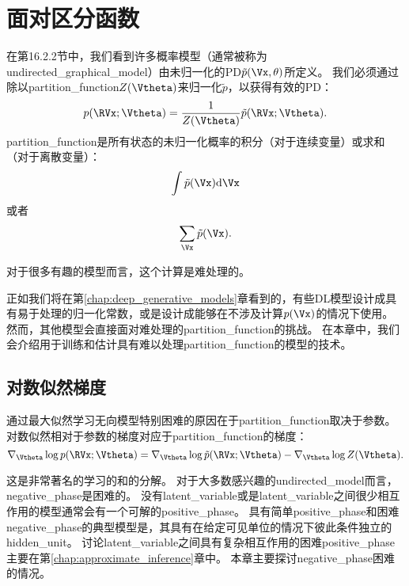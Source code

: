 \chapter{面对区分函数}
\label{chap:confronting_the_partition_function}
在第16.2.2节中，我们看到许多概率模型（通常被称为\gls{undirected_graphical_model}）由未归一化的\gls{PD}$\tilde{p}(\Vx, \theta)$所定义。
我们必须通过除以\gls{partition_function}$Z(\Vtheta)$来归一化$\tilde{p}$，以获得有效的\gls{PD}：
\begin{equation}
	p(\RVx; \Vtheta) = \frac{1}{Z(\Vtheta)} \tilde{p}(\RVx; \Vtheta).
\end{equation}
\gls{partition_function}是所有状态的未归一化概率的积分（对于连续变量）或求和（对于离散变量）：
\begin{equation}
	\int \tilde{p}(\Vx) \mathrm{d} \Vx
\end{equation}
或者
\begin{equation}
	\sum_{\Vx} \tilde{p} (\Vx).
\end{equation}


对于很多有趣的模型而言，这个计算是难处理的。


正如我们将在第\ref{chap:deep_generative_models}章看到的，有些\gls{DL}模型设计成具有易于处理的归一化常数，或是设计成能够在不涉及计算$p(\Vx)$的情况下使用。
然而，其他模型会直接面对难处理的\gls{partition_function}的挑战。
在本章中，我们会介绍用于训练和估计具有难以处理\gls{partition_function}的模型的技术。


\section{对数似然梯度}
\label{sec:the_log_likelihood_gradient}
通过最大似然学习无向模型特别困难的原因在于\gls{partition_function}取决于参数。
对数似然相对于参数的梯度对应于\gls{partition_function}的梯度：
\begin{equation}
	\nabla_{\Vtheta} \log p(\RVx; \Vtheta) = \nabla_{\Vtheta} \log \tilde{p}(\RVx; \Vtheta) -
\nabla_{\Vtheta} \log Z(\Vtheta).
\end{equation}


这是非常著名的学习的和的分解。
对于大多数感兴趣的\gls{undirected_model}而言，\gls{negative_phase}是困难的。
没有\gls{latent_variable}或是\gls{latent_variable}之间很少相互作用的模型通常会有一个可解的\gls{positive_phase}。
具有简单\gls{positive_phase}和困难\gls{negative_phase}的典型模型是，其具有在给定可见单位的情况下彼此条件独立的\gls{hidden_unit}。
讨论\gls{latent_variable}之间具有复杂相互作用的困难\gls{positive_phase}主要在第\ref{chap:approximate_inference}章中。
本章主要探讨\gls{negative_phase}困难的情况。


